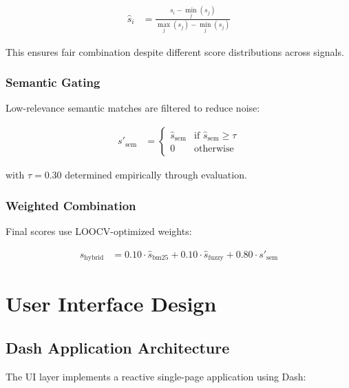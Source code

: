 \begin{align}
\hat{s}_i &= \frac{s_i - \min_j(s_j)}{\max_j(s_j) - \min_j(s_j)}
\end{align}

This ensures fair combination despite different score distributions across signals.

\subsubsection{Semantic Gating}
Low-relevance semantic matches are filtered to reduce noise:

\begin{align}
s'_{\text{sem}} &= \begin{cases}
  \hat{s}_{\text{sem}} & \text{if } \hat{s}_{\text{sem}} \geq \tau \\
  0 & \text{otherwise}
\end{cases}
\end{align}

with $\tau = 0.30$ determined empirically through evaluation.

\subsubsection{Weighted Combination}
Final scores use LOOCV-optimized weights:

\begin{align}
s_{\text{hybrid}} &= 0.10 \cdot \hat{s}_{\text{bm25}} + 0.10 \cdot \hat{s}_{\text{fuzzy}} + 0.80 \cdot s'_{\text{sem}}
\end{align}

\section{User Interface Design}

\subsection{Dash Application Architecture}

The UI layer implements a reactive single-page application using Dash:


